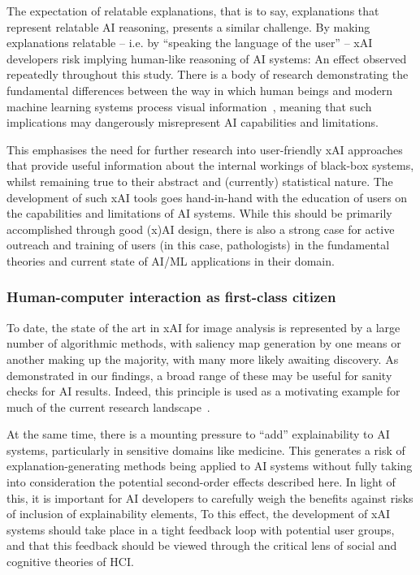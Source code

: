 \documentclass[final,5p,times,twocolumn,hyphens]{elsarticle}
\begin{document}
The expectation of relatable explanations, that is to say, explanations that represent relatable AI reasoning, presents a similar challenge. By making explanations relatable -- i.e. by ``speaking the language of the user'' -- xAI developers risk implying human-like reasoning of AI systems: An effect observed repeatedly throughout this study. There is a body of research demonstrating the fundamental differences between the way in which human beings and modern machine learning systems process visual information~\cite{geirhos2020shortcut}, meaning that such implications may dangerously misrepresent AI capabilities and limitations.

This emphasises the need for further research into user-friendly xAI approaches that provide useful information about the internal workings of black-box systems, whilst remaining true to their abstract and (currently) statistical nature. The development of such xAI tools goes hand-in-hand with the education of users on the capabilities and limitations of AI systems. While this should be primarily accomplished through good (x)AI design, there is also a strong case for active outreach and training of users (in this case, pathologists) in the fundamental theories and current state of AI/ML applications in their domain.

\subsubsection{Human-computer interaction as first-class citizen}

To date, the state of the art in xAI for image analysis is represented by a large number of algorithmic methods, with saliency map generation by one means or another making up the majority, with many more likely awaiting discovery. As demonstrated in our findings, a broad range of these may be useful for sanity checks for AI results. Indeed, this principle is used as a motivating example for much of the current research landscape~\cite{ribeiro2016trust}. 

At the same time, there is a mounting pressure to ``add'' explainability to AI systems, particularly in sensitive domains like medicine. This generates a risk of explanation-generating methods being applied to AI systems without fully taking into consideration the potential second-order effects described here. In light of this, it is important for AI developers to carefully weigh the benefits against risks of inclusion of explainability elements, To this effect, the development of xAI systems should take place in a tight feedback loop with potential user groups, and that this feedback should be viewed through the critical lens of social and cognitive theories of HCI.
\end{document}
